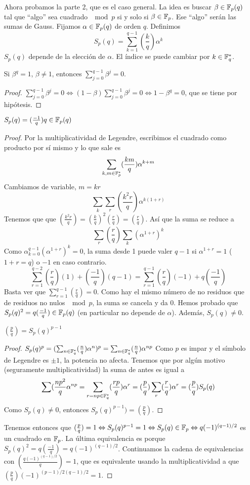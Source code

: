 \documentclass[CR.tex]{subfiles}
\begin{document}
\begin{dem}
Ahora probamos la parte 2, que es el caso general. La idea es buscar $\beta\in\mathbb{F}_p(q)$ tal que ``algo'' sea cuadrado $\mod p$ si y solo si $\beta\in\mathbb{F}_p$. Ese ``algo'' serán las sumas de Gauss. Fijamos $\alpha\in\mathbb{F}_p(q)$ de orden $q$. Definimos
\[
S_p(q)=\sum_{k=1}^{q-1}\left(\frac{k}{q}\right)\alpha^k
\]
$S_p(q)$ depende de la elección de $\alpha$. El índice se puede cambiar por $k\in\mathbb{F}_q^*$.
\begin{lemma}
Si $\beta^q=1$, $\beta\neq 1$, entonces $\sum_{j=0}^{q-1}\beta^j=0$. 
\end{lemma} 
\begin{proof}
$\sum_{j=0}^{q-1}\beta^j=0\Leftrightarrow (1-\beta)\sum_{j=0}^{q-1}\beta^j=0\Leftrightarrow 1-\beta^q=0$, que se tiene por hipótesis. 
\end{proof}

\begin{lemma}
$S_p(q)=(\frac{-1}{q})q\in\mathbb{F}_p(q)$
\end{lemma}
\begin{proof}
Por la multiplicatividad de Legendre, escribimos el cuadrado como producto por sí mismo y lo que sale es
\[
\sum_{k,m\in\mathbb{F}_p^*}(\frac{km}{q})\alpha^{k+m}
\]
Cambiamos de variable, $m=kr$
\[
\sum_{k}\sum_r(\frac{k^2r}{q})\alpha^{k(1+r)}
\]
Tenemos que que $(\frac{k^2r}{q})=(\frac{k}{q})^2(\frac{r}{q})=(\frac{r}{q})$. Así que la suma se reduce a
\[
\sum_r(\frac{r}{q})\sum_k(\alpha^{1+r})^k
\]
Como $\alpha_{k=0}^{q-1}(\alpha^{1+r})^k=0$, la suma desde 1 puede valer $q-1$ si $\alpha^{1+r}=1$ ($1+r=q$) o $-1$ en caso contrario. 
\[
\sum_{r=1}^{q-2}(\frac{r}{q})(1)+(\frac{-1}{q})(q-1)=\sum_{r=1}^{q-1}(\frac{r}{q})(-1)+q(\frac{-1}{q})
\]
Basta ver que $\sum_{r=1}^{q-1}(\frac{r}{q})=0$. Como hay el mismo número de no residuos que de residuos no nulos $\mod  p$, la suma se cancela y da 0. Hemos probado que $S_p(q)^2=q(\frac{-1}{q})\in\mathbb{F}_p(q)$ (en particular no depende de $\alpha$). Además, $S_p(q)\neq 0$. 

\begin{lemma}
$\left(\frac{p}{q}\right)=S_p(q)^{p-1}$
\end{lemma}
\begin{proof}
$S_p(q)^p=(\sum_{n\in\mathbb{F}_q^*}(\frac{n}{q})\alpha^n)^p=\sum_{n\in\mathbb{F}^*_q}(\frac{n}{q})\alpha^{np}$
Como $p$ es impar y el símbolo de Legendre es $\pm 1$, la potencia no afecta. 
Tenemos que por algún motivo (seguramente multiplicatividad) la suma de antes es igual a 
\[
\sum(\frac{np^2}{q}\alpha^{np}=\sum_{r=np\in \mathbb{F}_q^*}(\frac{rp}{q})\alpha^r=(\frac{p}{q})\sum_r(\frac{r}{q})\alpha^r=(\frac{p}{q})S_p(q)
\]
Como $S_p(q)\neq 0$, entonces $S_p(q)^{p-1})=(\frac{p}{q})$.
\end{proof}
Tenemos entonces que $(\frac{p}{q})=1\Leftrightarrow S_p(q)^{p-1}=1\Leftrightarrow S_p(q)\in\mathbb{F}_p\Leftrightarrow q(-1)^{(q-1)/2}$ es un cuadrado en $\mathbb{F}_p$. La última equivalencia es porque $S_p(q)^2=q(\frac{-1}{q})=q(-1)^{(q-1)/2}$. Continuamos la cadena de equivalencias con $(\frac{q(-1)^{(q-1)/2}}{q})=1$, que es equivalente usando la multiplicatividad a que $(\frac{p}{q})(-1)^{(p-1)/2 (q-1)/2}=1$. 

\end{proof}
\end{dem}
\end{document}
